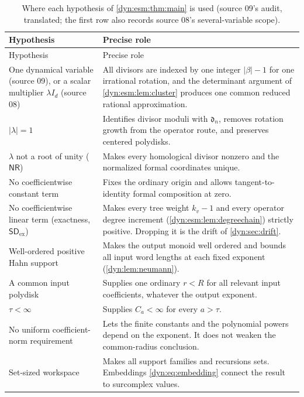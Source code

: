 \documentclass[11pt,letterpaper]{article}
\theoremstyle{definition}
\theoremstyle{remark}
\newcommand{\sdex}{\mathsf{SD}_{\mathrm{ex}}}
\newcommand{\nres}{\mathsf{NR}}
\numberwithin{equation}{section}
\begin{document}
\begin{longtable}{@{}P{0.28\textwidth}P{0.64\textwidth}@{}}
\caption{Where each hypothesis of \cref{dyn:esm:thm:main} is used (source
09's audit, translated; the first row also records source 08's
several-variable scope).}\label{dyn:esm:tab:audit}\\
\toprule
Hypothesis & Precise role\\
\midrule
\endfirsthead
\toprule
Hypothesis & Precise role\\
\midrule
\endhead
One dynamical variable (source 09), or a scalar multiplier $\lambda I_d$
(source 08) & All divisors are indexed by one integer $|\beta|-1$ for one
irrational rotation, and the determinant argument of
\cref{dyn:esm:lem:cluster} produces one common reduced rational
approximation.\\[3pt]
$|\lambda|=1$ & Identifies divisor moduli with $\mathfrak d_n$, removes
rotation growth from the operator route, and preserves centered
polydisks.\\[3pt]
$\lambda$ not a root of unity ($\nres$) & Makes every homological divisor
nonzero and the normalized formal coordinates unique.\\[3pt]
No coefficientwise constant term & Fixes the ordinary origin and allows
tangent-to-identity formal composition at zero.\\[3pt]
No coefficientwise linear term (exactness, $\sdex$) & Makes every tree
weight $k_v-1$ and every operator degree increment
(\cref{dyn:esm:lem:degreechain}) strictly positive. Dropping it is the drift
of \cref{dyn:sec:drift}.\\[3pt]
Well-ordered positive Hahn support & Makes the output monoid well ordered
and bounds all input word lengths at each fixed exponent
(\cref{dyn:lem:neumann}).\\[3pt]
A common input polydisk & Supplies one ordinary $r<R$ for all relevant input
coefficients, whatever the output exponent.\\[3pt]
$\tau<\infty$ & Supplies $C_a<\infty$ for every $a>\tau$.\\[3pt]
No uniform coefficient-norm requirement & Lets the finite constants and the
polynomial powers depend on the exponent. It does not weaken the
common-radius conclusion.\\[3pt]
Set-sized workspace & Makes all support families and recursions sets.
Embeddings \eqref{dyn:eq:embedding} connect the result to surcomplex
values.\\
\bottomrule
\end{longtable}
\end{document}
